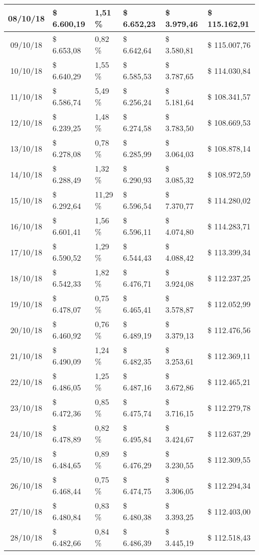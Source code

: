 \begin{small}
\begin{longtable}{|c|l|l|l|l|l|}
08/10/18 & \$ 6.600,19 & 1,51 \% & \$ 6.652,23 & \$ 3.979,46 & \$ 115.162,91 \\ \hline
09/10/18 & \$ 6.653,08 & 0,82 \% & \$ 6.642,64 & \$ 3.580,81 & \$ 115.007,76 \\ \hline
10/10/18 & \$ 6.640,29 & 1,55 \% & \$ 6.585,53 & \$ 3.787,65 & \$ 114.030,84 \\ \hline
11/10/18 & \$ 6.586,74 & 5,49 \% & \$ 6.256,24 & \$ 5.181,64 & \$ 108.341,57 \\ \hline
12/10/18 & \$ 6.239,25 & 1,48 \% & \$ 6.274,58 & \$ 3.783,50 & \$ 108.669,53 \\ \hline
13/10/18 & \$ 6.278,08 & 0,78 \% & \$ 6.285,99 & \$ 3.064,03 & \$ 108.878,14 \\ \hline
14/10/18 & \$ 6.288,49 & 1,32 \% & \$ 6.290,93 & \$ 3.085,32 & \$ 108.972,59 \\ \hline
15/10/18 & \$ 6.292,64 & 11,29 \% & \$ 6.596,54 & \$ 7.370,77 & \$ 114.280,02 \\ \hline
16/10/18 & \$ 6.601,41 & 1,56 \% & \$ 6.596,11 & \$ 4.074,80 & \$ 114.283,71 \\ \hline
17/10/18 & \$ 6.590,52 & 1,29 \% & \$ 6.544,43 & \$ 4.088,42 & \$ 113.399,34 \\ \hline
18/10/18 & \$ 6.542,33 & 1,82 \% & \$ 6.476,71 & \$ 3.924,08 & \$ 112.237,25 \\ \hline
19/10/18 & \$ 6.478,07 & 0,75 \% & \$ 6.465,41 & \$ 3.578,87 & \$ 112.052,99 \\ \hline
20/10/18 & \$ 6.460,92 & 0,76 \% & \$ 6.489,19 & \$ 3.379,13 & \$ 112.476,56 \\ \hline
21/10/18 & \$ 6.490,09 & 1,24 \% & \$ 6.482,35 & \$ 3.253,61 & \$ 112.369,11 \\ \hline
22/10/18 & \$ 6.486,05 & 1,25 \% & \$ 6.487,16 & \$ 3.672,86 & \$ 112.465,21 \\ \hline
23/10/18 & \$ 6.472,36 & 0,85 \% & \$ 6.475,74 & \$ 3.716,15 & \$ 112.279,78 \\ \hline
24/10/18 & \$ 6.478,89 & 0,82 \% & \$ 6.495,84 & \$ 3.424,67 & \$ 112.637,29 \\ \hline
25/10/18 & \$ 6.484,65 & 0,89 \% & \$ 6.476,29 & \$ 3.230,55 & \$ 112.309,55 \\ \hline
26/10/18 & \$ 6.468,44 & 0,75 \% & \$ 6.474,75 & \$ 3.306,05 & \$ 112.294,34 \\ \hline
27/10/18 & \$ 6.480,84 & 0,83 \% & \$ 6.480,38 & \$ 3.393,25 & \$ 112.403,00 \\ \hline
28/10/18 & \$ 6.482,66 & 0,84 \% & \$ 6.486,39 & \$ 3.445,19 & \$ 112.518,43 \\ \hline

\end{longtable}
\end{small}

